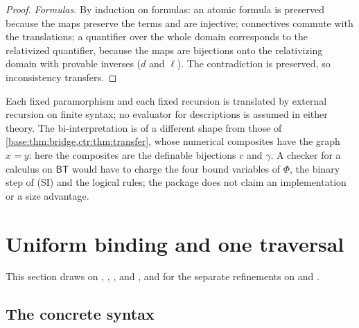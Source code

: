\begin{proof}
\emph{Formulas.} By induction on formulas: an atomic formula is preserved because the maps
preserve the terms and are injective; connectives commute with the translations; a quantifier
over the whole domain corresponds to the relativized quantifier, because the maps are
bijections onto the relativizing domain with provable inverses ($d$ and $\ell$). The
contradiction is preserved, so inconsistency transfers.
\end{proof}

Each fixed paramorphism and each fixed recursion is translated by external recursion on finite
syntax; no evaluator for descriptions is assumed in either theory. The bi-interpretation is of
a different shape from those of \cref{base:thm:bridge,ctr:thm:transfer}, whose numerical
composites have the graph $x=y$: here the composites are the definable bijections $c$ and
$\gamma$. A checker for a calculus on $\mathsf{BT}$ would have to charge the four bound
variables of $\Phi$, the binary step of (SI) and the logical rules; the package does not claim
an implementation or a size advantage.

\section{Uniform binding and one traversal}\label{ctr:sec:binding}

This section draws on , ,
,  and , and for the
separate refinements on  and .

\subsection{The concrete syntax}

